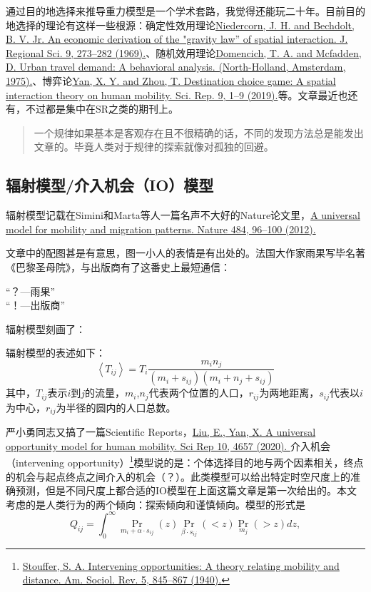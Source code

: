通过目的地选择来推导重力模型是一个学术套路，我觉得还能玩二十年。目前目的地选择的理论有这样一些根源：确定性效用理论\href{https://doi.org/10.1111/j.1467-9787.1969.tb01340.x}{Niedercorn, J. H. and Bechdolt, B. V. Jr. An economic derivation of the "gravity law” of spatial interaction. J. Regional Sci. 9, 273–282 (1969).}、随机效用理论\href{https://www.jstor.org/stable/134305?origin=crossref}{Domencich, T. A. and  Mcfadden, D. Urban travel demand: A behavioral analysis. (North-Holland, Amsterdam, 1975).}、博弈论\href{https://www.nature.com/articles/s41598-019-46026-w}{Yan, X. Y. and Zhou, T. Destination choice game: A spatial interaction theory on human mobility. Sci. Rep. 9, 1–9 (2019).}等。文章最近也还有，不过都是集中在SR之类的期刊上。

\begin{quote}
    一个规律如果基本是客观存在且不很精确的话，不同的发现方法总是能发出文章的。毕竟人类对于规律的探索就像对孤独的回避。
\end{quote}
  
\subsection{辐射模型/介入机会（IO）模型}

辐射模型记载在Simini和Marta等人一篇名声不大好的Nature论文里，\href{https://www.nature.com/articles/nature10856}{A universal model for mobility and migration patterns. Nature 484, 96–100 (2012).}

文章中的配图甚是有意思，图一小人的表情是有出处的。法国大作家雨果写毕名著《巴黎圣母院》，与出版商有了这番史上最短通信：
\begin{center}
    “？—雨果”\\
    “！—出版商”
\end{center}

辐射模型刻画了：

辐射模型的表述如下：\begin{equation}
\left\langle T_{i j}\right\rangle=T_{i} \frac{m_{i} n_{j}}{\left(m_{i}+s_{i j}\right)\left(m_{i}+n_{j}+s_{i j}\right)}
\end{equation}其中，$T_{ij}$表示$i$到$j$的流量，$m_i$,$n_j$代表两个位置的人口，$r_{ij}$为两地距离，$s_{ij}$代表以$i$为中心，$r_{ij}$为半径的圆内的人口总数。

严小勇同志又搞了一篇Scientific Reports，\href{https://doi.org/10.1038/s41598-020-61613-y}{Liu, E., Yan, X. A universal opportunity model for human mobility. Sci Rep 10, 4657 (2020). } 介入机会（intervening opportunity）\footnote{\href{https://www.baidu.com/link?url=x-lW8LLAwVj0UCSvfYwmmsvSsLs4MiNoFonbejPvLVbktEM5xeFK2-0nwgOvZprl&wd=&eqid=b1f1d8ba0007275e000000035e8c3a1e}{Stouffer, S. A. Intervening opportunities: A theory relating mobility and distance. Am. Sociol. Rev. 5, 845–867 (1940).}}模型说的是：个体选择目的地与两个因素相关，终点的机会与起点终点之间介入的机会（？）。此类模型可以给出特定时空尺度上的准确预测，但是不同尺度上都合适的IO模型在上面这篇文章是第一次给出的。本文考虑的是人类行为的两个倾向：探索倾向和谨慎倾向。模型的形式是\begin{equation}
    {Q}_{ij}={\int }_{0}^{\infty }{\Pr }_{{m}_{i}+\alpha \cdot {s}_{ij}}(z){\Pr }_{\beta \cdot {s}_{ij}}( < z){\Pr }_{{m}_{j}}( > z)dz,
\end{equation}

